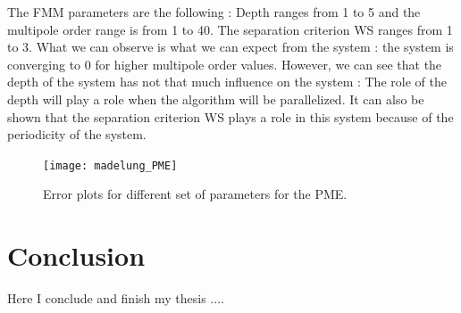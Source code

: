 \documentclass[11pt,twoside,a4paper]{report}
\begin{document}
	The FMM parameters are the following : Depth ranges from 1 to 5 and the multipole order range is from 1 to 40. The separation criterion WS ranges from 1 to 3.
	What we can observe is what we can expect from the system : the system is converging to $0$ for higher multipole order values. However, we can see that the depth of the system has not that much influence on the system : The role of the depth will play a role when the algorithm will be parallelized. It can also be shown that the separation criterion WS plays a role in this system because of the periodicity of the system.
	
	
	\begin{figure}[H]
	   \texttt{[image: madelung\_PME]}
	    \centering 
    \caption{Error plots for different set of parameters for the PME.}    
   \end{figure}  


\chapter{Conclusion}

Here I conclude and finish my thesis ....
	
	
	
	

\nocite{*}

 
\end{document}
